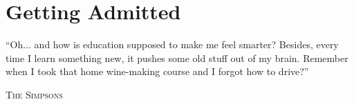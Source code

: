 \documentclass[oneside,11pt,dvipsnames]{book}
\begin{document}









%


\chapter{Getting Admitted}\label{sec:accepted}

\epigraph{``Oh... and how is education supposed to make me feel smarter? Besides, every time I learn something new, it pushes some old stuff out of my brain. Remember when I took that home wine-making course and I forgot how to drive?''}{\textsc{The Simpsons}}
\end{document}
